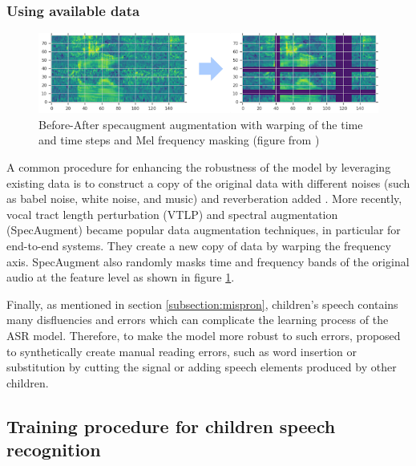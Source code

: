 \subsubsection{Using available data}
\begin{figure}
    \centering
    \includegraphics[width=1\textwidth]{imgs/specaugment.png}
    \caption{Before-After specaugment augmentation with warping of the time and time steps and Mel frequency masking (figure from \cite{specaugment})}
    \label{fig:specaugment}
\end{figure}
A common procedure for enhancing the robustness of the model by leveraging existing data is to construct a copy of the original data with different noises (such as babel noise, white noise, and music) and reverberation added \cite{liu2003noise,whitenoise,gelin2020babble,couvreur2000use,malek2017robust}. 
More recently, vocal tract length perturbation (VTLP)\cite{VTLP} and spectral augmentation (SpecAugment) \cite{specaugment} became popular data augmentation techniques, in particular for end-to-end systems. They create a new copy of data by warping the frequency axis. SpecAugment also randomly masks time and frequency bands of the original audio at the feature level as shown in figure \ref{fig:specaugment}.

Finally, as mentioned in section \ref{subsection:mispron}, children's speech contains many disfluencies and errors which can complicate the learning process of the ASR model. Therefore, to make the model more robust to such errors, \cite{gelin2021simulating} proposed to synthetically create manual reading errors, such as word insertion or substitution by cutting the signal or adding speech elements produced by other children.





\subsection{Training procedure for children speech recognition}%

